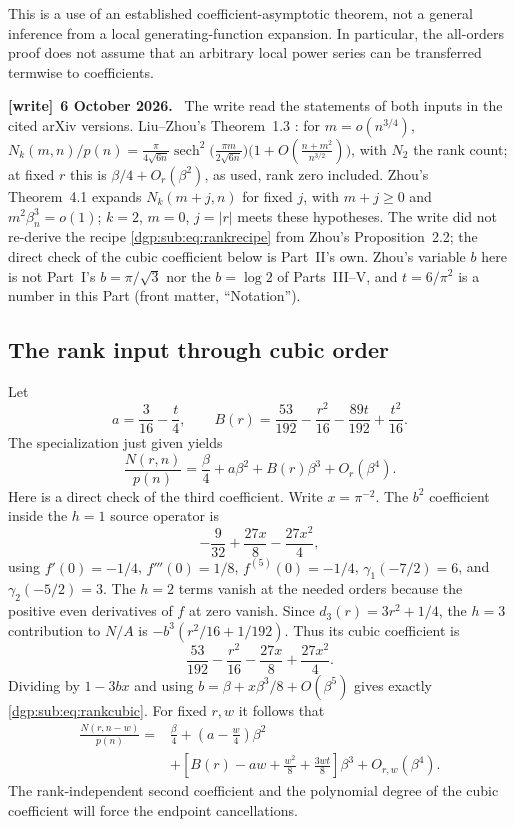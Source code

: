 \documentclass[11pt,letterpaper]{article}
\numberwithin{equation}{section}
\theoremstyle{remark}\newtheorem{remark}[theorem]{Remark}
\newenvironment{writenote}[1][]{\par\smallskip\begingroup\small
 \noindent\textbf{[write]}\if\relax\detokenize{#1}\relax\else~\textbf{#1.}\fi\ }%
 {\par\endgroup\smallskip}
\begin{document}
This is a use of an established coefficient-asymptotic theorem,
not a general inference from a local generating-function expansion.
In particular, the all-orders proof does not assume that an arbitrary
local power series can be transferred termwise to coefficients.
\begin{writenote}[6 October 2026]
The write read the statements of both inputs in the cited arXiv versions. Liu--Zhou's Theorem~1.3 \cite{lz}: for $m=o(n^{3/4})$, $N_k(m,n)/p(n)=\frac{\pi}{4\sqrt{6n}}\operatorname{sech}^2\bigl(\frac{\pi m}{2\sqrt{6n}}\bigr)\bigl(1+O(\frac{n+m^2}{n^{3/2}})\bigr)$, with $N_2$ the rank count; at fixed $r$ this is $\beta/4+O_r(\beta^2)$, as used, rank zero included. Zhou's Theorem~4.1 \cite{zhou} expands $N_k(m+j,n)$ for fixed $j$, with $m+j\ge0$ and $m^2\beta_n^3=o(1)$; $k=2$, $m=0$, $j=|r|$ meets these hypotheses. The write did not re-derive the recipe \eqref{dgp:sub:eq:rankrecipe} from Zhou's Proposition~2.2; the direct check of the cubic coefficient below is Part~II's own. Zhou's variable $b$ here is not Part~I's $b=\pi/\sqrt3$ nor the $b=\log2$ of Parts~III--V, and $t=6/\pi^2$ is a number in this Part (front matter, ``Notation'').
\end{writenote}

\subsection{The rank input through cubic order}
Let
\begin{equation}\label{dgp:sub:eq:ab}
 a=\frac3{16}-\frac t4,\qquad
 B(r)=\frac{53}{192}-\frac{r^2}{16}-\frac{89t}{192}+\frac{t^2}{16}.
\end{equation}
The specialization just given yields
\begin{equation}\label{dgp:sub:eq:rankcubic}
 \frac{N(r,n)}{p(n)}=\frac\beta4+a\beta^2+B(r)\beta^3+O_r(\beta^4).
\end{equation}
Here is a direct check of the third coefficient. Write $x=\pi^{-2}$.
The $b^2$ coefficient inside the $h=1$ source operator is
\[
 -\frac9{32}+\frac{27x}8-\frac{27x^2}4,
\]
using $f'(0)=-1/4$, $f'''(0)=1/8$, $f^{(5)}(0)=-1/4$,
$\gamma_1(-7/2)=6$, and $\gamma_2(-5/2)=3$.
The $h=2$ terms vanish at the needed orders because the positive even
derivatives of $f$ at zero vanish. Since $d_3(r)=3r^2+1/4$,
the $h=3$ contribution to $N/A$ is
$-b^3(r^2/16+1/192)$. Thus its cubic coefficient is
\[
 \frac{53}{192}-\frac{r^2}{16}-\frac{27x}8+\frac{27x^2}4.
\]
Dividing by $1-3bx$ and using $b=\beta+x\beta^3/8+O(\beta^5)$
gives exactly \eqref{dgp:sub:eq:rankcubic}. For fixed $r,w$ it follows that
\begin{align}\label{dgp:sub:eq:Nshift}
 \frac{N(r,n-w)}{p(n)}={}&\frac\beta4+\left(a-\frac w4\right)\beta^2\nonumber\\
 &+\left[B(r)-aw+\frac{w^2}8+\frac{3wt}8\right]\beta^3
 +O_{r,w}(\beta^4).
\end{align}
The rank-independent second coefficient and the polynomial degree
of the cubic coefficient will force the endpoint cancellations.
\end{document}
